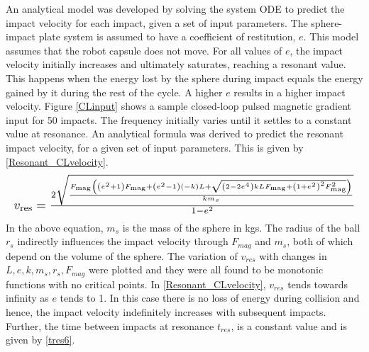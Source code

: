\documentclass[letterpaper, 10 pt, conference]{ieeeconf}  %
\begin{document}
An analytical model was developed by solving the system ODE to predict the impact velocity for each impact, given a set of input parameters. The sphere-impact plate system is assumed to have a coefficient of restitution, $e$. This model assumes that the robot capsule does not move. For all values of $e$, the impact velocity initially increases and ultimately saturates, reaching a resonant value. This happens when the energy lost by the sphere during impact equals the energy gained by it during the rest of the cycle. A higher $e$ results in a higher impact velocity.  Figure \ref{CLinput} shows a sample closed-loop pulsed magnetic gradient input for 50 impacts. The frequency initially varies until it settles to a constant value at resonance. An analytical formula was derived to predict the resonant impact velocity, for a given set of input parameters. This is given by \cref{Resonant_CLvelocity}.
%	
\begin{equation}
\resizebox{\linewidth}{!}
{$
	v_{\text{res}}=\frac{2 \sqrt{\frac{F_{\text{mag}} \left(\left(e^2+1\right) F_{\text{mag}}+\left(e^2-1\right) (-k) L+\sqrt{\left(2-2 e^4\right) k L F_{\text{mag}}+\left(1+e^2\right)^2 F_{\text{mag}}^2}\right)}{k m_s}}}{1-e^2}
	$}
\label{Resonant_CLvelocity}
\end{equation}
In the above equation, $m_s$ is the mass of the sphere in kgs. The radius of the ball $r_s$ indirectly influences the impact velocity through $F_{mag}$ and $m_s$, both of which depend on the volume of the sphere. The variation of $v_{res}$ with changes in $L,e,k,m_s,r_s,F_{mag}$ were plotted and they were all found to be monotonic functions with no critical points. In \cref{Resonant_CLvelocity}, $v_{res}$ tends towards infinity as $e$ tends to 1. In this case there is no loss of energy during collision and hence, the impact velocity indefinitely increases with subsequent impacts. Further, the time between impacts at resonance $t_{res}$, is a constant value and is given by \cref{tres6}.
\end{document}
